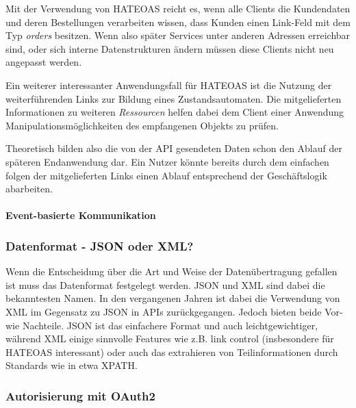 \documentclass[12pt,a4paper,bibliography=totocnumbered,listof=totocnumbered]{scrartcl}
\begin{document}


Mit der Verwendung von \ac{HATEOAS} reicht es, wenn alle Clients die Kundendaten und deren Bestellungen verarbeiten wissen, dass Kunden einen Link-Feld mit dem Typ \textit{orders} besitzen. Wenn also später Services unter anderen Adressen erreichbar sind, oder sich interne Datenstrukturen ändern müssen diese Clients nicht neu angepasst werden.

Ein weiterer interessanter Anwendungsfall für \ac{HATEOAS} ist die Nutzung der weiterführenden Links zur Bildung eines Zustandsautomaten. Die mitgelieferten Informationen zu weiteren \textit{Ressourcen} helfen dabei dem Client einer Anwendung Manipulationsmöglichkeiten des empfangenen Objekts zu prüfen.


Theoretisch bilden also die von der \ac{API} gesendeten Daten schon den Ablauf der späteren Endanwendung dar. Ein Nutzer könnte bereits durch dem einfachen folgen der mitgelieferten Links einen Ablauf entsprechend der Geschäftslogik abarbeiten.

\paragraph{Event-basierte Kommunikation}


\subsubsection{Datenformat - JSON oder XML?} 

Wenn die Entscheidung über die Art und Weise der Datenübertragung gefallen ist muss das Datenformat festgelegt werden. JSON und XML sind dabei die bekanntesten Namen. In den vergangenen Jahren ist dabei die Verwendung von XML im Gegensatz zu JSON in \acp{API} zurückgegangen\cite{duvander2}. Jedoch bieten beide Vor- wie Nachteile. JSON ist das einfachere Format und auch leichtgewichtiger, während XML einige sinnvolle Features wie z.B. link control (insbesondere für \ac{HATEOAS} interessant) oder auch das extrahieren von Teilinformationen durch Standards wie in etwa XPATH\cite[S.101]{buildingms}.

\subsubsection{Autorisierung mit OAuth2}
\end{document}
